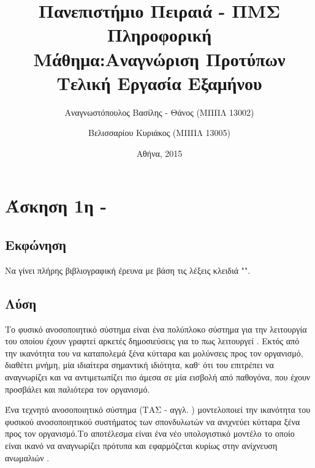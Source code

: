 \documentclass{assignment}
\title{Πανεπιστήμιο Πειραιά - ΠΜΣ Πληροφορική\\Μάθημα:Αναγνώριση Προτύπων \\ Τελική Εργασία Εξαμήνου }
\date{Αθήνα, 2015}
\author{Αναγνωστόπουλος Βασίλης - Θάνος (ΜΠΠΛ 13002) \and Βελισσαρίου Κυριάκος (ΜΠΠΛ 13005)}
\begin{document}
\maketitle

\setcounter{page}{1} 

\pagestyle{plain}
\tableofcontents
\listoffigures

\makeatletter
\newcommand{\newalgname}[1]{%
  \renewcommand{\ALG@name}{#1}%
}
\newalgname{Αλγόριθμος}
\renewcommand{\listalgorithmname}{Κατάλογος αλγορίθμων}
\makeatother

\listofalgorithms

\renewcommand\listoflistingscaption{Κατάλογος πηγαίου κώδικα}
\renewcommand\listingscaption{Πηγαίος κώδικας}

\listoflistings
\newpage

\setcounter{page}{1} 

\section{Άσκηση 1η - }
\subsection{Εκφώνηση}

Να γίνει πλήρης βιβλιογραφική έρευνα με βάση τις λέξεις κλειδιά "".

\subsection {Λύση}

Το φυσικό ανοσοποιητικό σύστημα είναι ένα πολύπλοκο σύστημα για την λειτουργία του οποίου έχουν γραφτεί αρκετές δημοσιεύσεις για το πως λειτουργεί \cite{wiki:immune_system}. Εκτός από την ικανότητα του να καταπολεμά ξένα κύτταρα και μολύνσεις προς τον οργανισμό, διαθέτει μνήμη, μία ιδιαίτερα σημαντική ιδιότητα, καθ` ότι του επιτρέπει να αναγνωρίζει και να αντιμετωπίζει πιο άμεσα σε μία εισβολή από παθογόνα, που έχουν προσβάλει και παλιότερα τον οργανισμό. 

Ένα τεχνητό ανοσοποιητικό σύστημα (ΤΑΣ - αγγλ. ) μοντελοποιεί την ικανότητα του φυσικού ανοσοποιητικού συστήματος των σπονδυλωτών να ανιχνεύει κύτταρα ξένα προς τον οργανισμό.Το αποτέλεσμα είναι ένα νέο υπολογιστικό μοντέλο το οποίο είναι ικανό να αναγνωρίζει πρότυπα και εφαρμόζεται κυρίως στην ανίχνευση ανωμαλιών \cite{engelbrecht,wiki:artificial_immune_system}.
\end{document}
